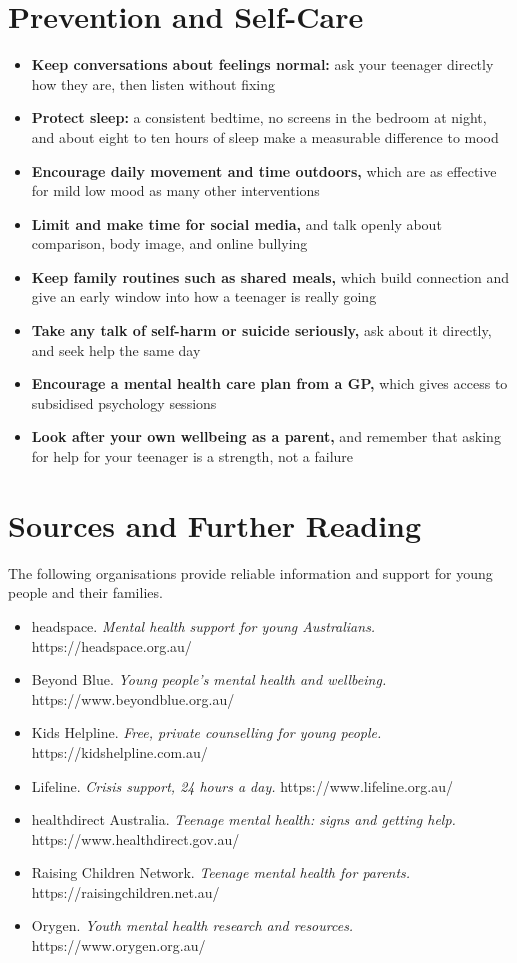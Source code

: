 \section*{Prevention and Self-Care}
\begin{itemize}
    \item \textbf{Keep conversations about feelings normal:} ask your teenager directly how they are, then listen without fixing
    \item \textbf{Protect sleep:} a consistent bedtime, no screens in the bedroom at night, and about eight to ten hours of sleep make a measurable difference to mood
    \item \textbf{Encourage daily movement and time outdoors,} which are as effective for mild low mood as many other interventions
    \item \textbf{Limit and make time for social media,} and talk openly about comparison, body image, and online bullying
    \item \textbf{Keep family routines such as shared meals,} which build connection and give an early window into how a teenager is really going
    \item \textbf{Take any talk of self-harm or suicide seriously,} ask about it directly, and seek help the same day
    \item \textbf{Encourage a mental health care plan from a GP,} which gives access to subsidised psychology sessions
    \item \textbf{Look after your own wellbeing as a parent,} and remember that asking for help for your teenager is a strength, not a failure
\end{itemize}

\section*{Sources and Further Reading}
The following organisations provide reliable information and support for young people and their families.

\begin{itemize}
    \item headspace. \textit{Mental health support for young Australians.} https://headspace.org.au/
    \item Beyond Blue. \textit{Young people's mental health and wellbeing.} https://www.beyondblue.org.au/
    \item Kids Helpline. \textit{Free, private counselling for young people.} https://kidshelpline.com.au/
    \item Lifeline. \textit{Crisis support, 24 hours a day.} https://www.lifeline.org.au/
    \item healthdirect Australia. \textit{Teenage mental health: signs and getting help.} https://www.healthdirect.gov.au/
    \item Raising Children Network. \textit{Teenage mental health for parents.} https://raisingchildren.net.au/
    \item Orygen. \textit{Youth mental health research and resources.} https://www.orygen.org.au/
\end{itemize}

\clearpage
